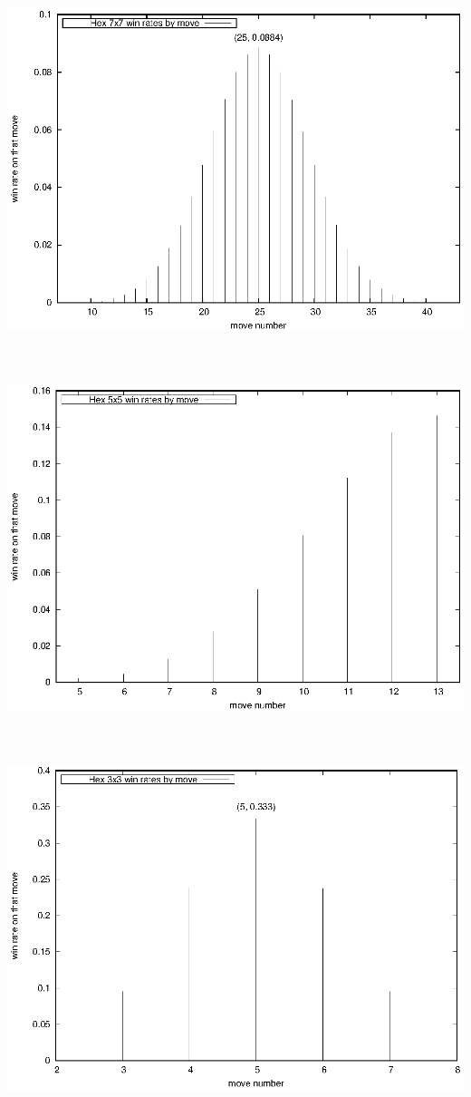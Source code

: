 \documentclass[12pt]{article}
\begin{document}
\ \hfill \includegraphics{code/data/gn/winrate.7.eps} \hfill \ 

\ \hfill \includegraphics{code/data/gn/winrate.5.eps} \hfill \ 

\ \hfill \includegraphics{code/data/gn/winrate.3.eps} \hfill \ 
\end{document}
